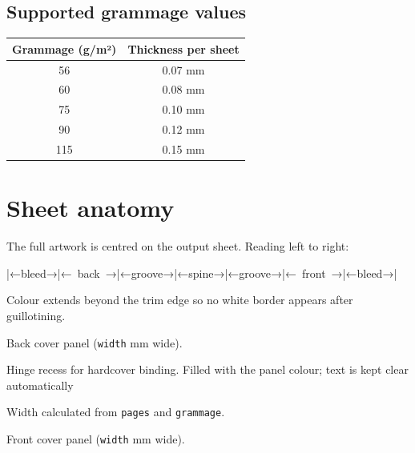 \documentclass[12pt, a4paper]{article}
\newcommand{\opt}[1]{\texttt{#1}}
\begin{document}
\subsection{Supported grammage values}

\begin{center}
\begin{tabular}{cc}
  \toprule
  \textbf{Grammage (g/m²)} & \textbf{Thickness per sheet} \\
  \midrule
  56  & 0.07 mm \\
  60  & 0.08 mm \\
  75  & 0.10 mm \\
  90  & 0.12 mm \\
  115 & 0.15 mm \\
  \bottomrule
\end{tabular}
\end{center}

\section{Sheet anatomy}

The full artwork is centred on the output sheet. Reading left to right:

\begin{center}
\ttfamily
|{\normalfont←}bleed{\normalfont→}|{\normalfont←}\ back\ {\normalfont→}|{\normalfont←}groove{\normalfont→}|{\normalfont←}spine{\normalfont→}|{\normalfont←}groove{\normalfont→}|{\normalfont←}\ front\ {\normalfont→}|{\normalfont←}bleed{\normalfont→}|
\end{center}

\begin{description}[style=nextline, leftmargin=2cm, labelwidth=1.8cm]
  \item[\opt{bleed}]  Colour extends beyond the trim edge so no white border appears after guillotining.
  \item[\opt{back}]   Back cover panel (\texttt{width} mm wide).
  \item[\opt{groove}] Hinge recess for hardcover binding. Filled with the panel colour; text is kept clear automatically
  \item[\opt{spine}]  Width calculated from \opt{pages} and \opt{grammage}.
  \item[\opt{front}]  Front cover panel (\texttt{width} mm wide).
\end{description}
\end{document}
